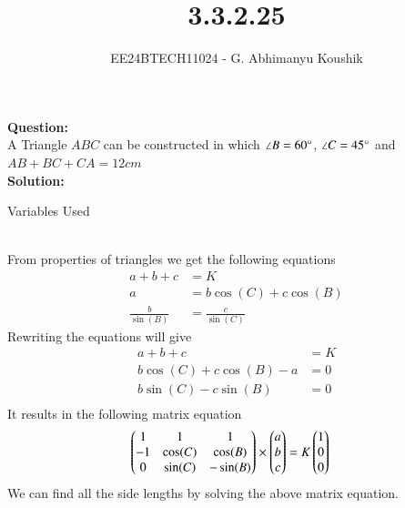 \documentclass[journal]{IEEEtran}
\begin{document}

\vspace{3cm}

\title{3.3.2.25}
\author{EE24BTECH11024 - G. Abhimanyu Koushik
}
{\let\newpage\relax\maketitle}

\renewcommand{\thefigure}{\theenumi}
\renewcommand{\thetable}{\theenumi}
\setlength{\intextsep}{10pt} %

\textbf{Question:}\\
A Triangle $ABC$ can be constructed in which $\angle B=60\degree$, $\angle C=45\degree$ and $AB+BC+CA=12cm$\\
\textbf{Solution:}
\begin{table}[h!]    
  \centering
  
  \caption{Variables Used}
  \label{tab10.5.3.9.1}
\end{table}\\
From properties of triangles we get the following equations
\begin{align}
a+b+c&=K\\
a&=b\cos(C)+c\cos(B)\\
\frac{b}{\sin(B)}&=\frac{c}{\sin(C)}
\end{align}
Rewriting the equations will give
\begin{align}
	a+b+c&=K\\
	b\cos(C)+c\cos(B)-a&=0\\
	b\sin(C)-c\sin(B)&=0\\
\end{align}
It results in the following matrix equation
\begin{align}
  \begin{pmatrix}1 & 1 & 1\\-1 & \cos(C) & \cos(B)\\0 & \sin(C) & -\sin(B)\end{pmatrix}\times\begin{pmatrix}a\\b\\c\end{pmatrix}&=K\begin{pmatrix}1\\0\\0\end{pmatrix}
\end{align}
We can find all the side lengths by solving the above matrix equation.
\end{document}
